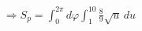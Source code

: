 \documentclass[preview]{standalone}
\begin{document}
\begin{align*}
\Rightarrow S_p = \int_0^{2\pi} d\varphi \int_1^{10} \frac{8}{9} \sqrt{u} \, du
\end{align*}
\end{document}
